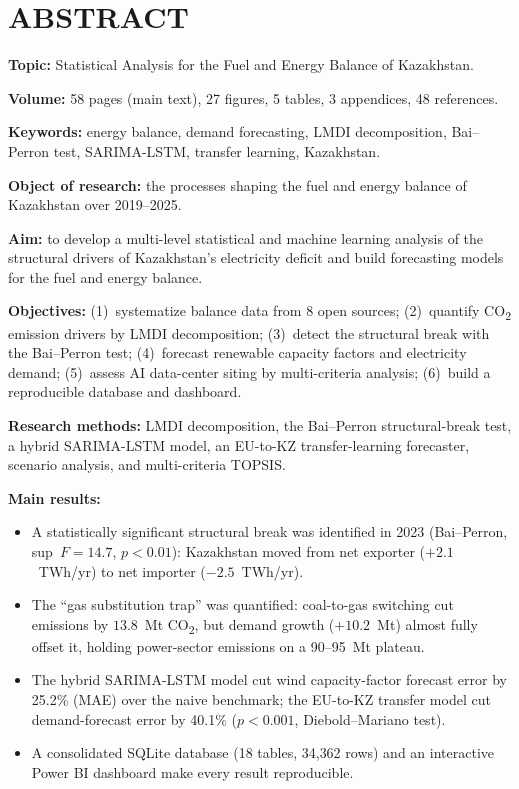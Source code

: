 
\chapter*{ABSTRACT}

\begingroup
\singlespacing
\setlength{\parskip}{3pt}
\setlength{\parindent}{0pt}

\textbf{Topic:} Statistical Analysis for the Fuel and Energy Balance of Kazakhstan.

\textbf{Volume:} 58 pages (main text), 27 figures, 5 tables, 3 appendices, 48 references.

\textbf{Keywords:} energy balance, demand forecasting, LMDI decomposition, Bai--Perron test, SARIMA-LSTM, transfer learning, Kazakhstan.

\textbf{Object of research:} the processes shaping the fuel and energy balance of Kazakhstan over 2019--2025.

\textbf{Aim:} to develop a multi-level statistical and machine learning analysis of the structural drivers of Kazakhstan's electricity deficit and build forecasting models for the fuel and energy balance.

\textbf{Objectives:} (1)~systematize balance data from 8 open sources; (2)~quantify CO\textsubscript{2} emission drivers by LMDI decomposition; (3)~detect the structural break with the Bai--Perron test; (4)~forecast renewable capacity factors and electricity demand; (5)~assess AI data-center siting by multi-criteria analysis; (6)~build a reproducible database and dashboard.

\textbf{Research methods:} LMDI decomposition, the Bai--Perron structural-break test, a hybrid SARIMA-LSTM model, an EU-to-KZ transfer-learning forecaster, scenario analysis, and multi-criteria TOPSIS.

\textbf{Main results:}
\begin{itemize}[leftmargin=*, topsep=1pt, itemsep=1pt]
    \item A statistically significant structural break was identified in 2023 (Bai--Perron, sup~$F = 14.7$, $p < 0.01$): Kazakhstan moved from net exporter ($+2.1$~TWh/yr) to net importer ($-2.5$~TWh/yr).
    \item The ``gas substitution trap'' was quantified: coal-to-gas switching cut emissions by $13.8$~Mt CO\textsubscript{2}, but demand growth ($+10.2$~Mt) almost fully offset it, holding power-sector emissions on a 90--95~Mt plateau.
    \item The hybrid SARIMA-LSTM model cut wind capacity-factor forecast error by 25.2\% (MAE) over the naive benchmark; the EU-to-KZ transfer model cut demand-forecast error by 40.1\% ($p < 0.001$, Diebold--Mariano test).
    \item A consolidated SQLite database (18 tables, 34{,}362 rows) and an interactive Power BI dashboard make every result reproducible.
\end{itemize}

